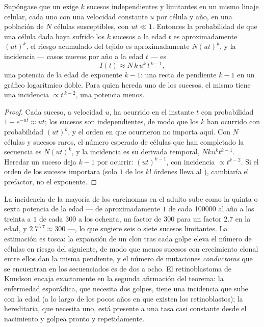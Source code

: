 \begin{theorem}\label{thm:b3:cancer-biology:armitage-doll}
Supóngase que un  exige $k$ sucesos independientes y limitantes en
un mismo linaje celular, cada uno con una velocidad constante $u$ por
célula y año, en una población de $N$ células susceptibles, con
$ut \ll 1$. Entonces la probabilidad de que una célula dada haya sufrido
los $k$ sucesos a la edad $t$ es aproximadamente $(ut)^{k}$, el riesgo
acumulado del tejido es aproximadamente $N(ut)^{k}$, y la incidencia ---
casos nuevos por año a la edad $t$ --- es
\[
I(t) \approx N\,k\,u^{k}\,t^{\,k-1},
\]
una potencia de la edad de exponente $k - 1$: una recta de pendiente
$k - 1$ en un gráfico logarítmico doble. Para quien hereda uno de los
sucesos, el mismo  tiene una incidencia $\propto t^{\,k-2}$, una
potencia menos.
\end{theorem}
\begin{proof}
Cada suceso, a velocidad $u$, ha ocurrido en el instante $t$ con
probabilidad $1 - e^{-ut} \approx ut$; los sucesos son independientes, de
modo que los $k$ han ocurrido con probabilidad $(ut)^{k}$, y el orden en
que ocurrieron no importa aquí. Con $N$ células y sucesos raros, el
número esperado de células que han completado la secuencia es
$N(ut)^{k}$, y la incidencia es su derivada temporal, $Nku^{k}t^{k-1}$.
Heredar un suceso deja $k - 1$ por ocurrir: $(ut)^{k-1}$, con incidencia
$\propto t^{k-2}$. Si el orden de los sucesos importara (solo $1$ de los
$k!$ órdenes lleva al ), cambiaría el prefactor, no el exponente.
\end{proof}

\begin{example}\label{ex:b3:cancer-biology:exponent}
La incidencia de la mayoría de los carcinomas en el adulto sube como la
quinta o sexta potencia de la edad --- de aproximadamente $1$ de cada
\num{100000} al año a los treinta a $1$ de cada $300$ a los ochenta, un
factor de $300$ para un factor $2.7$ en la edad, y
$2.7^{5.7} \approx 300$ ---, lo que sugiere seis o siete sucesos
limitantes. La estimación es tosca: la expansión de un clon tras cada
golpe eleva el número de células en riesgo del siguiente, de modo que
menos sucesos con crecimiento clonal entre ellos dan la misma pendiente,
y el número de mutaciones \emph{conductoras} que se encuentran en los
 secuenciados es de dos a ocho. El retinoblastoma de Knudson
encaja exactamente en la segunda afirmación del teorema: la enfermedad
esporádica, que necesita dos golpes, tiene una incidencia que sube con la
edad (a lo largo de los pocos años en que existen los retinoblastos); la
hereditaria, que necesita uno, está presente a una tasa casi constante
desde el nacimiento y golpea pronto y repetidamente.
\end{example}

